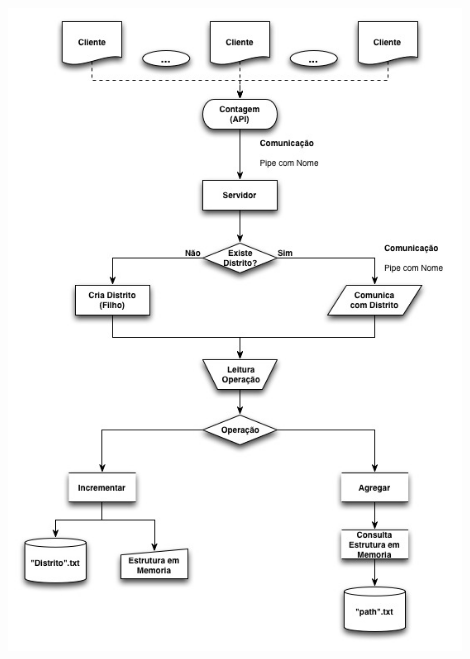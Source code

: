 \documentclass[10pt,notitlepage]{article}
\begin{document}
\includegraphics[width=0.90\textwidth]{so.jpg}
\end{document}
